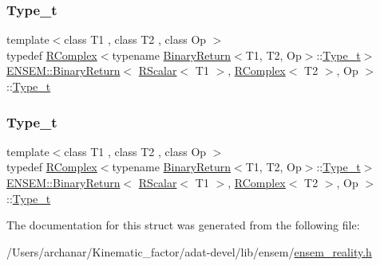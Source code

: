 \subsubsection{\texorpdfstring{Type\_t}{Type\_t}\hspace{0.1cm}{\footnotesize\ttfamily [2/3]}}
{\footnotesize\ttfamily template$<$class T1 , class T2 , class Op $>$ \\
typedef \mbox{\hyperlink{classENSEM_1_1RComplex}{R\+Complex}}$<$typename \mbox{\hyperlink{structENSEM_1_1BinaryReturn}{Binary\+Return}}$<$T1, T2, Op$>$\+::\mbox{\hyperlink{structENSEM_1_1BinaryReturn_3_01RScalar_3_01T1_01_4_00_01RComplex_3_01T2_01_4_00_01Op_01_4_ad277d696b0a4fe7ee7b2141ddac014e9}{Type\+\_\+t}}$>$ \mbox{\hyperlink{structENSEM_1_1BinaryReturn}{E\+N\+S\+E\+M\+::\+Binary\+Return}}$<$ \mbox{\hyperlink{classENSEM_1_1RScalar}{R\+Scalar}}$<$ T1 $>$, \mbox{\hyperlink{classENSEM_1_1RComplex}{R\+Complex}}$<$ T2 $>$, Op $>$\+::\mbox{\hyperlink{structENSEM_1_1BinaryReturn_3_01RScalar_3_01T1_01_4_00_01RComplex_3_01T2_01_4_00_01Op_01_4_ad277d696b0a4fe7ee7b2141ddac014e9}{Type\+\_\+t}}}

\mbox{\label{structENSEM_1_1BinaryReturn_3_01RScalar_3_01T1_01_4_00_01RComplex_3_01T2_01_4_00_01Op_01_4_ad277d696b0a4fe7ee7b2141ddac014e9}} 
\subsubsection{\texorpdfstring{Type\_t}{Type\_t}\hspace{0.1cm}{\footnotesize\ttfamily [3/3]}}
{\footnotesize\ttfamily template$<$class T1 , class T2 , class Op $>$ \\
typedef \mbox{\hyperlink{classENSEM_1_1RComplex}{R\+Complex}}$<$typename \mbox{\hyperlink{structENSEM_1_1BinaryReturn}{Binary\+Return}}$<$T1, T2, Op$>$\+::\mbox{\hyperlink{structENSEM_1_1BinaryReturn_3_01RScalar_3_01T1_01_4_00_01RComplex_3_01T2_01_4_00_01Op_01_4_ad277d696b0a4fe7ee7b2141ddac014e9}{Type\+\_\+t}}$>$ \mbox{\hyperlink{structENSEM_1_1BinaryReturn}{E\+N\+S\+E\+M\+::\+Binary\+Return}}$<$ \mbox{\hyperlink{classENSEM_1_1RScalar}{R\+Scalar}}$<$ T1 $>$, \mbox{\hyperlink{classENSEM_1_1RComplex}{R\+Complex}}$<$ T2 $>$, Op $>$\+::\mbox{\hyperlink{structENSEM_1_1BinaryReturn_3_01RScalar_3_01T1_01_4_00_01RComplex_3_01T2_01_4_00_01Op_01_4_ad277d696b0a4fe7ee7b2141ddac014e9}{Type\+\_\+t}}}



The documentation for this struct was generated from the following file\+:\begin{DoxyCompactItemize}
\item 
/\+Users/archanar/\+Kinematic\+\_\+factor/adat-\/devel/lib/ensem/\mbox{\hyperlink{adat-devel_2lib_2ensem_2ensem__reality_8h}{ensem\+\_\+reality.\+h}}\end{DoxyCompactItemize}
